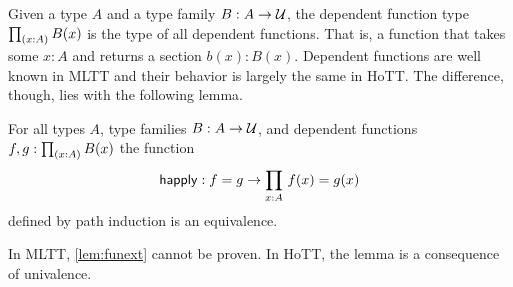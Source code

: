 \documentclass[main.tex]{subfiles}
\begin{document}
Given a type $A$ and a type family $B : A \to \mathcal{U}$, the dependent function type $\prd{x:A}B(x)$ is the type of all dependent functions.
That is, a function that takes some $x : A$ and returns a section $b(x) : B(x)$. Dependent functions are well known in MLTT and their behavior is largely
the same in HoTT. The difference, though, lies with the following lemma.

\begin{lemma}
    \label{lem:funext}
    For all types $A$, type families $B : A \to \mathcal{U}$, and dependent functions $f,g : \prd{x:A}B(x)$ the function
    $$\happly : f=g \to \prd{x:A}f(x)=g(x)$$
    defined by path induction is an equivalence.
\end{lemma}

In MLTT, \cref{lem:funext} cannot be proven. In HoTT, the lemma is a consequence of univalence. 
    
\end{document}
